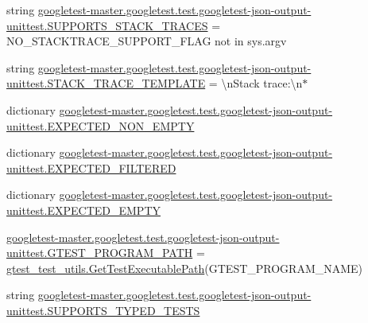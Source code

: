 \begin{DoxyCompactItemize}
\item 
string \mbox{\hyperlink{namespacegoogletest-master_1_1googletest_1_1test_1_1googletest-json-output-unittest_a4f2a16da5067932a6b44666b7b9710c0}{googletest-\/master.\+googletest.\+test.\+googletest-\/json-\/output-\/unittest.\+S\+U\+P\+P\+O\+R\+T\+S\+\_\+\+S\+T\+A\+C\+K\+\_\+\+T\+R\+A\+C\+ES}} = N\+O\+\_\+\+S\+T\+A\+C\+K\+T\+R\+A\+C\+E\+\_\+\+S\+U\+P\+P\+O\+R\+T\+\_\+\+F\+L\+AG not in sys.\+argv
\item 
string \mbox{\hyperlink{namespacegoogletest-master_1_1googletest_1_1test_1_1googletest-json-output-unittest_a832c7710783e5c52d3e05891bbfe4678}{googletest-\/master.\+googletest.\+test.\+googletest-\/json-\/output-\/unittest.\+S\+T\+A\+C\+K\+\_\+\+T\+R\+A\+C\+E\+\_\+\+T\+E\+M\+P\+L\+A\+TE}} = \textquotesingle{}\textbackslash{}n\+Stack trace\+:\textbackslash{}n$\ast$\textquotesingle{}
\item 
dictionary \mbox{\hyperlink{namespacegoogletest-master_1_1googletest_1_1test_1_1googletest-json-output-unittest_a7a2a1d49ccbde704b7bfd6d161b6ff04}{googletest-\/master.\+googletest.\+test.\+googletest-\/json-\/output-\/unittest.\+E\+X\+P\+E\+C\+T\+E\+D\+\_\+\+N\+O\+N\+\_\+\+E\+M\+P\+TY}}
\item 
dictionary \mbox{\hyperlink{namespacegoogletest-master_1_1googletest_1_1test_1_1googletest-json-output-unittest_a395a373f96d407e24845ca33b33cbd24}{googletest-\/master.\+googletest.\+test.\+googletest-\/json-\/output-\/unittest.\+E\+X\+P\+E\+C\+T\+E\+D\+\_\+\+F\+I\+L\+T\+E\+R\+ED}}
\item 
dictionary \mbox{\hyperlink{namespacegoogletest-master_1_1googletest_1_1test_1_1googletest-json-output-unittest_ae91b27b5b27cea3106ed15bbf9e717ee}{googletest-\/master.\+googletest.\+test.\+googletest-\/json-\/output-\/unittest.\+E\+X\+P\+E\+C\+T\+E\+D\+\_\+\+E\+M\+P\+TY}}
\item 
\mbox{\hyperlink{namespacegoogletest-master_1_1googletest_1_1test_1_1googletest-json-output-unittest_ab9ad2b07b444a6ef134876cfaaa68045}{googletest-\/master.\+googletest.\+test.\+googletest-\/json-\/output-\/unittest.\+G\+T\+E\+S\+T\+\_\+\+P\+R\+O\+G\+R\+A\+M\+\_\+\+P\+A\+TH}} = \mbox{\hyperlink{namespacegtest__test__utils_a89ed3717984a80ffbb7a9c92f71b86a2}{gtest\+\_\+test\+\_\+utils.\+Get\+Test\+Executable\+Path}}(G\+T\+E\+S\+T\+\_\+\+P\+R\+O\+G\+R\+A\+M\+\_\+\+N\+A\+ME)
\item 
string \mbox{\hyperlink{namespacegoogletest-master_1_1googletest_1_1test_1_1googletest-json-output-unittest_a3c7c1b4bb06557989e663799e93b8593}{googletest-\/master.\+googletest.\+test.\+googletest-\/json-\/output-\/unittest.\+S\+U\+P\+P\+O\+R\+T\+S\+\_\+\+T\+Y\+P\+E\+D\+\_\+\+T\+E\+S\+TS}}
\end{DoxyCompactItemize}
